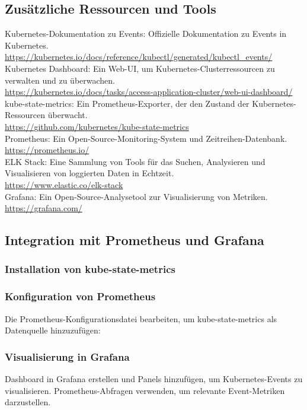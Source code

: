\subsection{Zusätzliche Ressourcen und Tools}
Kubernetes-Dokumentation zu Events: Offizielle Dokumentation zu Events in Kubernetes.\\
\url{https://kubernetes.io/docs/reference/kubectl/generated/kubectl_events/}\\
Kubernetes Dashboard: Ein Web-UI, um Kubernetes-Clusterressourcen zu verwalten und zu überwachen.\\
\url{https://kubernetes.io/docs/tasks/access-application-cluster/web-ui-dashboard/}\\
kube-state-metrics: Ein Prometheus-Exporter, der den Zustand der Kubernetes-Ressourcen überwacht.\\
\url{https://github.com/kubernetes/kube-state-metrics}\\
Prometheus: Ein Open-Source-Monitoring-System und Zeitreihen-Datenbank.\\
\url{https://prometheus.io/}\\
ELK Stack: Eine Sammlung von Tools für das Suchen, Analysieren und Visualisieren von loggierten Daten in Echtzeit.\\
\url{https://www.elastic.co/elk-stack}\\
Grafana: Ein Open-Source-Analysetool zur Visualisierung von Metriken.\\
\url{https://grafana.com/}

\newpage
\subsection{Integration mit Prometheus und Grafana}

\subsubsection{Installation von kube-state-metrics}

\subsubsection{Konfiguration von Prometheus}
Die Prometheus-Konfigurationsdatei bearbeiten, um kube-state-metrics als Datenquelle hinzuzufügen:


\subsubsection{Visualisierung in Grafana}
Dashboard in Grafana erstellen und Panels hinzufügen, um Kubernetes-Events zu visualisieren. Prometheus-Abfragen verwenden, um relevante Event-Metriken darzustellen.


